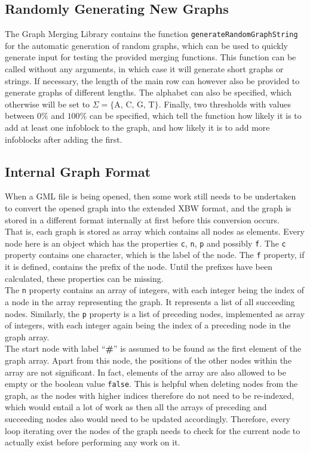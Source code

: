 \documentclass[a4paper,12pt,twoside,BCOR=10mm]{scrbook}
\begin{document}
\subsection{Randomly Generating New Graphs}

The Graph Merging Library contains the function \texttt{generateRandomGraphString} for 
the automatic generation of random graphs, which can be used to quickly generate input for testing the 
provided merging functions. 
This function can be called without any arguments, in which case it will generate short graphs 
or strings. If necessary, the length of the main row can however also be provided to generate 
graphs of different lengths. The alphabet can also be specified, which otherwise will be 
set to $ \Sigma = \{ \textrm{A, C, G, T} \} $. Finally, two thresholds with values between $ 0\% $ and $ 100\% $ can 
be specified, which tell the function how likely it is to add at least one infoblock to the graph, 
and how likely it is to add more infoblocks after adding the first.


\subsection{Internal Graph Format}

When a GML file is being opened, then some work still needs to be undertaken 
to convert the opened graph into the extended XBW format, and the graph is stored 
in a different format internally at first before this conversion occurs. \\
That is, each graph is stored as array which contains all nodes as elements. 
Every node here is an object which has the properties \texttt{c}, \texttt{n}, \texttt{p} and 
possibly \texttt{f}. The \texttt{c} property contains one character, which is the label of the node. 
The \texttt{f} property, if it is defined, contains the prefix of the node. Until the prefixes have 
been calculated, these properties can be missing. \\
The \texttt{n} property contains an array of integers, with each integer being the index 
of a node in the array representing the graph. It represents a list of all succeeding nodes. 
Similarly, the \texttt{p} property is a list of preceding nodes, implemented as array of integers, 
with each integer again being the index of a preceding node in the graph array. \\
The start node with label “\textbf{\#}” is assumed to be found as the first element 
of the graph array. Apart from this node, the positions of the other nodes within 
the array are not significant. In fact, elements of the array are also allowed to 
be empty or the boolean value \texttt{false}. This is helpful when deleting 
nodes from the graph, as the nodes with higher indices therefore do not need to be re-indexed, 
which would entail a lot of work as then all the arrays of preceding and succeeding nodes 
also would need to be updated accordingly. 
Therefore, every loop iterating over the nodes of the graph needs to check for the 
current node to actually exist before performing any work on it.
\end{document}
